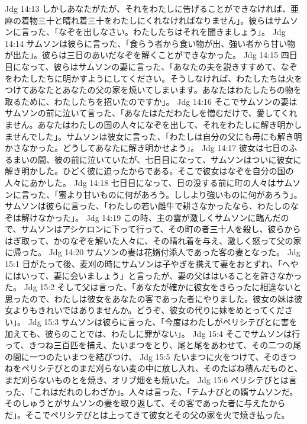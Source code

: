 Jdg 14:13  しかしあなたがたが、それをわたしに告げることができなければ、亜麻の着物三十と晴れ着三十をわたしにくれなければなりません」。彼らはサムソンに言った、「なぞを出しなさい。わたしたちはそれを聞きましょう」。
Jdg 14:14  サムソンは彼らに言った、「食らう者から食い物が出、強い者から甘い物が出た」。彼らは三日のあいだなぞを解くことができなかった。
Jdg 14:15  四日目になって、彼らはサムソンの妻に言った、「あなたの夫を説きすすめて、なぞをわたしたちに明かすようにしてください。そうしなければ、わたしたちは火をつけてあなたとあなたの父の家を焼いてしまいます。あなたはわたしたちの物を取るために、わたしたちを招いたのですか」。
Jdg 14:16  そこでサムソンの妻はサムソンの前に泣いて言った、「あなたはただわたしを憎むだけで、愛してくれません。あなたはわたしの国の人々になぞを出して、それをわたしに解き明かしませんでした」。サムソンは彼女に言った、「わたしは自分の父にも母にも解き明かさなかった。どうしてあなたに解き明かせよう」。
Jdg 14:17  彼女は七日のふるまいの間、彼の前に泣いていたが、七日目になって、サムソンはついに彼女に解き明かした。ひどく彼に迫ったからである。そこで彼女はなぞを自分の国の人々にあかした。
Jdg 14:18  七日目になって、日の没する前に町の人々はサムソンに言った、「蜜より甘いものに何があろう。ししより強いものに何があろう」。サムソンは彼らに言った、「わたしの若い雌牛で耕さなかったなら、わたしのなぞは解けなかった」。
Jdg 14:19  この時、主の霊が激しくサムソンに臨んだので、サムソンはアシケロンに下って行って、その町の者三十人を殺し、彼らからはぎ取って、かのなぞを解いた人々に、その晴れ着を与え、激しく怒って父の家に帰った。
Jdg 14:20  サムソンの妻は花婿付添人であった客の妻となった。
Jdg 15:1  日がたって後、麦刈の時にサムソンは子やぎを携えて妻をおとずれ、「へやにはいって、妻に会いましょう」と言ったが、妻の父ははいることを許さなかった。
Jdg 15:2  そして父は言った、「あなたが確かに彼女をきらったに相違ないと思ったので、わたしは彼女をあなたの客であった者にやりました。彼女の妹は彼女よりもきれいではありませんか。どうぞ、彼女の代りに妹をめとってください」。
Jdg 15:3  サムソンは彼らに言った、「今度はわたしがペリシテびとに害を加えても、彼らのことでは、わたしに罪がない」。
Jdg 15:4  そこでサムソンは行って、きつね三百匹を捕え、たいまつをとり、尾と尾をあわせて、その二つの尾の間に一つのたいまつを結びつけ、
Jdg 15:5  たいまつに火をつけて、そのきつねをペリシテびとのまだ刈らない麦の中に放し入れ、そのたばね積んだものと、まだ刈らないものとを焼き、オリブ畑をも焼いた。
Jdg 15:6  ペリシテびとは言った、「これはだれのしわざか」。人々は言った、「テムナびとの婿サムソンだ。そのしゅうとがサムソンの妻を取り返して、その客であった者に与えたからだ」。そこでペリシテびとは上ってきて彼女とその父の家を火で焼き払った。
